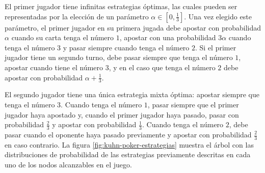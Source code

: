 El primer jugador tiene infinitas estrategias óptimas, las cuales pueden ser representadas por la elección de un parámetro $\alpha \in \left[ 0, \frac{1}{3} \right]$. Una vez elegido este parámetro, el primer jugador en su primera jugada debe apostar con probabilidad $\alpha$ cuando su carta tenga el número $1$, apostar con una probabilidad $3 \alpha$ cuando tenga el número $3$ y pasar siempre cuando tenga el número $2$. Si el primer jugador tiene un segundo turno, debe pasar siempre que tenga el número $1$, apostar cuando tiene el número $3$, y en el caso que tenga el número $2$ debe apostar con probabilidad $\alpha + \frac{1}{3}$.

El segundo jugador tiene una única estrategia mixta óptima: apostar siempre que tenga el número $3$. Cuando tenga el número $1$, pasar siempre que el primer jugador haya apostado y, cuando el primer jugador haya pasado, pasar con probabilidad $\frac{2}{3}$ y apostar con probabilidad $\frac{1}{3}$. Cuando tenga el número $2$, debe pasar cuando el oponente haya pasado previamente y apostar con probabilidad $\frac{2}{3}$ en caso contrario. La figura \ref{fig:kuhn-poker-estrategias} muestra el árbol con las distribuciones de probabilidad de las estrategias previamente descritas en cada uno de los nodos alcanzables en el juego.

